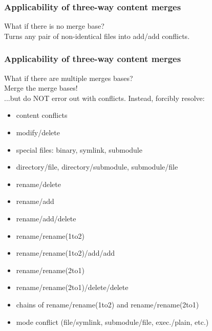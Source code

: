 \documentclass[t]{beamer}
\begin{document}

\begin{frame}
  \frametitle{Applicability of three-way content merges}

  What if there is no merge base?
  \pause
  \\[\baselineskip]
  Turns any pair of non-identical files into add/add conflicts.

\end{frame}


\begin{frame}
  \frametitle{Applicability of three-way content merges}

  What if there are multiple merges bases?
  \pause
  \\[\baselineskip]
  Merge the merge bases!
  \pause
  \\[\baselineskip]
  ...but do NOT error out with conflicts.  Instead, forcibly resolve:
  \pause
  \begin{itemize}[<+->]
    \item content conflicts
    \item modify/delete
    \item special files: binary, symlink, submodule
    \item directory/file, directory/submodule, submodule/file
    \item rename/delete
    \item rename/add
    \item rename/add/delete
    \item rename/rename(1to2)
    \item rename/rename(1to2)/add/add
    \item rename/rename(2to1)
    \item rename/rename(2to1)/delete/delete
    \item chains of rename/rename(1to2) and rename/rename(2to1)
    \item mode conflict (file/symlink, submodule/file, exec./plain, etc.)
  \end{itemize}

\end{frame}

\end{document}
